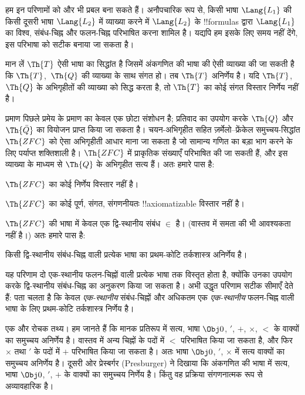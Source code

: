 \documentclass[../../../include/open-logic-section]{subfiles}
\begin{document}


हम इन परिणामों को और भी प्रबल बना सकते हैं। अनौपचारिक रूप से, किसी भाषा
$\Lang{L_1}$ की किसी दूसरी भाषा $\Lang{L_2}$ में व्याख्या करने में
$\Lang{L_2}$ के !!{formula}s द्वारा $\Lang{L_1}$ का विश्व, संबंध-चिह्न और
फलन-चिह्न परिभाषित करना शामिल है। यद्यपि हम इसके लिए समय नहीं देंगे, इस
परिभाषा को सटीक बनाया जा सकता है।

\begin{thm}
  मान लें $\Th{T}$ ऐसी भाषा का सिद्धांत है जिसमें अंकगणित की भाषा की ऐसी
  व्याख्या की जा सकती है कि $\Th{T}$,~$\Th{Q}$ की व्याख्या के साथ संगत हो।
  तब $\Th{T}$ अनिर्णेय है। यदि $\Th{T}$,~$\Th{Q}$ के अभिगृहीतों की
  व्याख्या को सिद्ध करता है, तो $\Th{T}$ का कोई संगत विस्तार निर्णेय नहीं
  है।
\end{thm}

प्रमाण पिछले प्रमेय के प्रमाण का केवल एक छोटा संशोधन है; प्रतिवाद का उपयोग
करके $\Th{Q}$ और $\Th{\bar Q}$ का वियोजन प्राप्त किया जा सकता है।
चयन-अभिगृहीत सहित ज़र्मेलो--फ्रेंकेल समुच्चय-सिद्धांत $\Th{ZFC}$ को ऐसा
अभिगृहीती आधार माना जा सकता है जो सामान्य गणित का बड़ा भाग करने के लिए
पर्याप्त शक्तिशाली है। $\Th{ZFC}$ में प्राकृतिक संख्याएँ परिभाषित की जा
सकती हैं, और इस व्याख्या के माध्यम से $\Th{Q}$ के अभिगृहीत सत्य हैं। अतः
हमारे पास है:

\begin{cor}
$\Th{ZFC}$ का कोई निर्णेय विस्तार नहीं है।
\end{cor}

\begin{cor}
$\Th{ZFC}$ का कोई पूर्ण, संगत, संगणनीयतः !!{axiomatizable} विस्तार नहीं है।
\end{cor}

$\Th{ZFC}$ की भाषा में केवल एक द्वि-स्थानीय संबंध $\in$ है। (वास्तव में
समता की भी आवश्यकता नहीं है।) अतः हमारे पास है:

\begin{cor}
किसी द्वि-स्थानीय संबंध-चिह्न वाली प्रत्येक भाषा का प्रथम-कोटि तर्कशास्त्र
अनिर्णेय है।
\end{cor}

यह परिणाम दो एक-स्थानीय फलन-चिह्नों वाली प्रत्येक भाषा तक विस्तृत होता है,
क्योंकि उनका उपयोग करके द्वि-स्थानीय संबंध-चिह्न का अनुकरण किया जा सकता है।
अभी उद्धृत परिणाम सटीक सीमाएँ देते हैं: पता चलता है कि केवल
\emph{एक-स्थानीय} संबंध-चिह्नों और अधिकतम एक \emph{एक-स्थानीय} फलन-चिह्न
वाली भाषा के लिए प्रथम-कोटि तर्कशास्त्र निर्णेय है।

एक और रोचक तथ्य। हम जानते हैं कि मानक प्रतिरूप में सत्य, भाषा
$\Obj 0$, $'$, $+$, $\times$, $<$ के वाक्यों का समुच्चय अनिर्णेय है।
वास्तव में अन्य चिह्नों के पदों में $<$ परिभाषित किया जा सकता है, और फिर
$\times$ तथा $'$ के पदों में $+$ परिभाषित किया जा सकता है। अतः भाषा
$\Obj 0$, $'$, $\times$ में सत्य वाक्यों का समुच्चय अनिर्णेय है। दूसरी ओर
प्रेस्बर्गर (Presburger) ने दिखाया कि अंकगणित की भाषा में सत्य, भाषा
$\Obj 0$, $'$, $+$ के वाक्यों का समुच्चय निर्णेय है। किंतु वह प्रक्रिया
संगणनात्मक रूप से अव्यावहारिक है।
\end{document}
